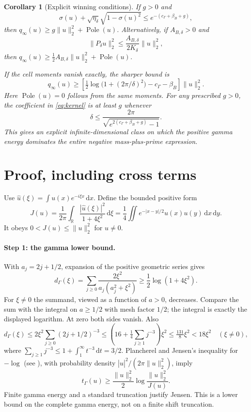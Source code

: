 \documentclass[11pt]{article}
\newtheorem{corollary}[theorem]{Corollary}
\newcommand{\R}{\mathbb R}
\newcommand{\dd}{\,\mathrm d}
\newcommand{\norm}[1]{\lVert#1\rVert}
\newcommand{\Pole}{\operatorname{Pole}}
\begin{document}
\begin{corollary}[Explicit winning conditions]
If $g>0$ and
\begin{equation}
 \sigma(u)+\sqrt{\eta_\delta}\sqrt{1-\sigma(u)^2}
 \le e^{-(c_\Gamma+\beta_B+g)},
 \label{eq:win}
\end{equation}
then $q_\infty(u)\ge g\norm u_2^2+\Pole(u)$. Alternatively, if $A_{B,\delta}>0$ and
\[
 \norm{P_\delta u}_2^2\le\frac{A_{B,\delta}}{2K_\delta}\norm u_2^2,
\]
then $q_\infty(u)\ge\tfrac12A_{B,\delta}\norm u_2^2+\Pole(u)$.

If the cell moments vanish exactly, the sharper bound is
\begin{equation}
 q_\infty(u)\ge
 \left[\tfrac12\log\bigl(1+(2\pi/\delta)^2\bigr)-c_\Gamma-\beta_B\right]\norm u_2^2.
 \label{eq:kernel}
\end{equation}
Here $\Pole(u)=0$ follows from the same moments. For any prescribed $g>0$, the coefficient in \eqref{eq:kernel} is at least $g$ whenever
\begin{equation}
 \delta\le\frac{2\pi}{\sqrt{e^{2(c_\Gamma+\beta_B+g)}-1}}.
 \label{eq:deltachoice}
\end{equation}
This gives an explicit infinite-dimensional class on which the positive gamma energy dominates the entire negative mass-plus-prime expression.
\end{corollary}

\section{Proof, including cross terms}
Use $\widehat u(\xi)=\int u(x)e^{-i\xi x}\dd x$. Define the bounded positive form
\begin{equation}
 J(u)=\frac1{2\pi}\int_\R\frac{|\widehat u(\xi)|^2}{1+4\xi^2}\dd\xi
 =\frac14\iint e^{-|x-y|/2}u(x)u(y)\dd x\dd y.
 \label{eq:J}
\end{equation}
It obeys $0<J(u)\le\norm u_2^2$ for $u\ne0$.

\paragraph{Step 1: the gamma lower bound.}
With $a_j=2j+1/2$, expansion of the positive geometric series gives
\[
 d_\Gamma(\xi)=\sum_{j\ge0}\frac{2\xi^2}{a_j(a_j^2+\xi^2)}
 \ge\frac12\log(1+4\xi^2).
\]
For $\xi\ne0$ the summand, viewed as a function of $a>0$, decreases. Compare the sum with the integral on $a\ge1/2$ with mesh factor $1/2$; the integral is exactly the displayed logarithm. At zero both sides vanish. Also
\[
 d_\Gamma(\xi)\le 2\xi^2\sum_{j\ge0}(2j+1/2)^{-3}
 \le\left(16+\tfrac14\sum_{j\ge1}j^{-3}\right)\xi^2
 \le\tfrac{131}{8}\xi^2<18\xi^2\quad(\xi\ne0),
\]
where $\sum_{j\ge1}j^{-3}\le1+\int_1^\infty t^{-3}\dd t=3/2$.
Plancherel and Jensen's inequality for $-\log$ (see \cite{HLP}), with probability density $|\widehat u|^2/(2\pi\norm u_2^2)$, imply
\begin{equation}
 t_\Gamma(u)\ge\frac{\norm u_2^2}{2}
 \log\frac{\norm u_2^2}{J(u)}.
 \label{eq:Jensen}
\end{equation}
Finite gamma energy and a standard truncation justify Jensen. This is a lower bound on the complete gamma energy, not on a finite shift truncation.
\end{document}
